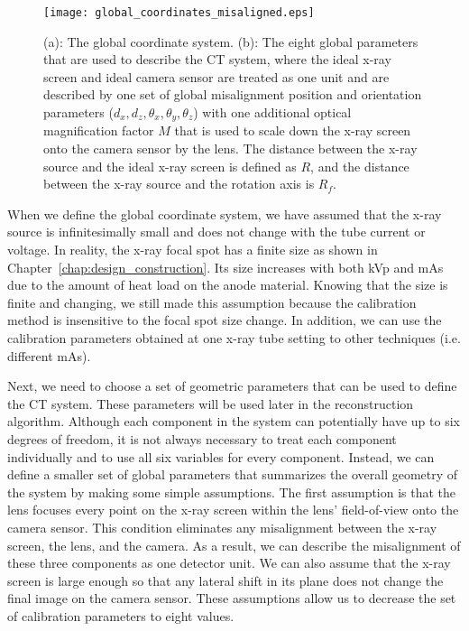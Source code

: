 \begin{figure}[ht]
\centering
\texttt{[image: global\_coordinates\_misaligned.eps]}
\caption{ (a): The global coordinate system.  (b): The eight global parameters that are used to describe the CT system, where the ideal x-ray screen and ideal camera sensor are treated as one unit and are described by one set of global misalignment position and orientation parameters ($d_x, d_z, \theta_x, \theta_y, \theta_z$) with one additional optical magnification factor $M$ that is used to scale down the x-ray screen onto the camera sensor by the lens.  The distance between the x-ray source and the ideal x-ray screen is defined as $R$, and the distance between the x-ray source and the rotation axis is $R_f$.}
\label{fig:global_coord_misaligned}
\end{figure}

When we define the global coordinate system, we have assumed that the x-ray source is infinitesimally small and does not change with the tube current or voltage.  In reality, the x-ray focal spot has a finite size as shown in Chapter~\ref{chap:design_construction}.  Its size increases with both kVp and mAs due to the amount of heat load on the anode material.  Knowing that the size is finite and changing, we still made this assumption because the calibration method is insensitive to the focal spot size change.  In addition, we can use the calibration parameters obtained at one x-ray tube setting to other techniques (i.e. different mAs). 

Next, we need to choose a set of geometric parameters that can be used to define the CT system.  These parameters will be used later in the reconstruction algorithm.  Although each component in the system can potentially have up to six degrees of freedom, it is not always necessary to treat each component individually and to use all six variables for every component.  Instead, we can define a smaller set of global parameters that summarizes the overall geometry of the system by making some simple assumptions.  The first assumption is that the lens focuses every point on the x-ray screen within the lens' field-of-view onto the camera sensor.  This condition eliminates any misalignment between the x-ray screen, the lens, and the camera.  As a result, we can describe the misalignment of these three components as one detector unit.  We can also assume that the x-ray screen is large enough so that any lateral shift in its plane does not change the final image on the camera sensor.  These assumptions allow us to decrease the set of calibration parameters to eight values.

